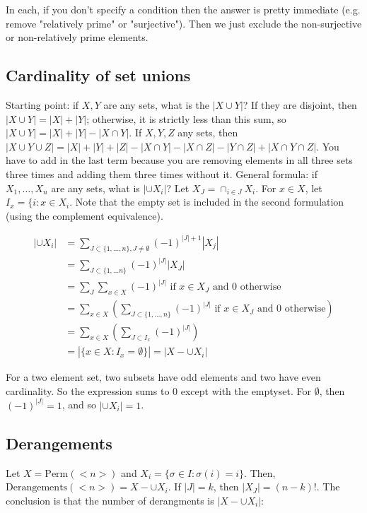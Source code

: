 \documentclass[12pt]{article}
\theoremstyle{definition}
\begin{document}
In each, if you don't specify a condition then the answer is pretty immediate
(e.g. remove "relatively prime" or "surjective"). Then we just exclude the
non-surjective or non-relatively prime elements.

\subsection{Cardinality of set unions}

Starting point: if $X, Y$ are any sets, what is the $|X \cup Y|$? If they are
disjoint, then $|X \cup Y| = |X| + |Y|$; otherwise, it is strictly less than
this sum, so $|X \cup Y| = |X| + |Y| - |X \cap Y|$. If $X, Y, Z$ any sets, then
$|X \cup Y \cup Z| = |X| + |Y| + |Z| - |X \cap Y| - |X \cap Z| - |Y \cap Z| +
|X \cap Y \cap Z|$. You have to add in the last term because you are removing
elements in all three sets three times and adding them three times without it.
General formula: if $X_1, \ldots, X_n$ are any sets, what is $|\cup X_i|$? Let
$X_J = \cap_{i \in J} X_i$. For $x \in X$, let $I_x = \{i : x \in X_i$. Note
    that the empty set is included in the second formulation (using the
    complement equivalence). 

\begin{align*}
|\cup X_i| &= \sum_{J \subset \{1, \ldots, n\}, J \ne \emptyset} (-1)^{|J| + 1} |X_j| \\
&= \sum_{J \subset \{1, \ldots n\}} (-1)^{|J|} |X_J| \\
&= \sum_J \sum_{x \in X} (-1)^{|J|} \text{ if $x \in X_J$ and 0 otherwise} \\
&= \sum_{x \in X} \left( \sum_{J \subset \{1, \ldots, n\}}  (-1)^{|J|} \text{ if $x \in X_J$ and 0 otherwise} \right) \\
&= \sum_{x \in X} \left(\sum_{J \subset I_x} (-1)^{|J|} \right) \\
&= |\{x \in X: I_x = \emptyset\}| = |X - \cup X_i|
\end{align*}

For a two element set, two subsets have odd elements and two have even
cardinality. So the expression sums to 0 except with the emptyset. For
$\emptyset$, then $(-1)^{|J|} = 1$, and so $|\cup X_i| = 1$.

\subsection{Derangements}

Let $X = \mathrm{Perm}(<n>)$ and $X_i = \{ \sigma \in I: \sigma(i) = i\}$.
Then, $\mathrm{Derangements}(<n>) = X - \cup X_i$. If $|J| = k$, then $|X_J| =
(n - k)!$.  The conclusion is that the number of derangments is $|X - \cup
X_i|$:
\end{document}
